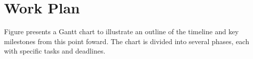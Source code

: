
%

\chapter{Work Plan}
\label{cha:work_plan}

Figure presents a Gantt chart to illustrate an outline of the timeline and key milestones
from this point foward. The chart is divided into several phases, each with specific tasks and deadlines.


